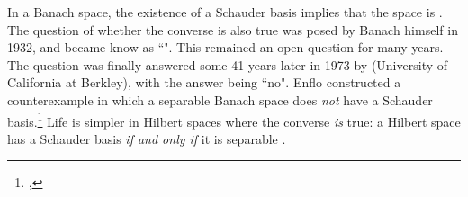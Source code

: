 In a Banach space, the existence of a Schauder basis implies that the space is  %
. %
The \label{BasisProblem} question of whether the converse is also true was posed by Banach himself in 1932,
and became know as ``".
This remained an open question for many years.
The question was finally answered some 41 years later in 1973 by  (University of California at Berkley), 
with the answer being ``no".
Enflo constructed a counterexample in which a separable Banach space does \emph{not} have a Schauder 
basis.\footnote{
  ,
  }
Life is simpler in Hilbert spaces where the converse \emph{is} true:
a Hilbert space has a Schauder basis \emph{if and only if} it is separable .

